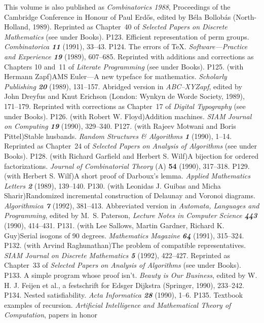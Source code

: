  This volume is also published as {\sl Combinatorics 1988}, Proceedings
 of the Cambridge Conference in Honour of Paul Erd\H os, edited
 by B\'ela Bollob\'as (North-Holland, 1989).
 Reprinted as Chapter~40 of {\sl Selected Papers on
 Discrete Mathematics\/} (see under Books).
\p P123. Efficient representation of perm groups. {\sl Combinatorica \bf11}
 (1991), 33--43.
\p P124. The errors of \TeX. {\sl Software---Practice
 and Experience\/ \bf19} (1989), 607--685. Reprinted with additions
 and corrections as Chapters 10 and~11 of {\sl Literate Programming\/}
 (see under Books).
\p P125. (with Hermann Zapf)\xskip AMS Euler---A new typeface for mathematics.
 {\sl Scholarly Publishing\/ \bf20} (1989), 131--157. Abridged version
 in {\sl ABC--XYZapf}, edited by John Dreyfus and Knut Erichson
 (London: Wynkyn de Worde Society, 1989), 171--179.
 Reprinted with corrections as Chapter~17 of {\sl Digital Typography\/}
 (see under Books).
\p P126. (with Robert W. Floyd)\xskip Addition machines. {\sl SIAM Journal on
 Computing\/ \bf19} (1990), 329--340.
\p P127. (with Rajeev Motwani and Boris Pittel)\xskip Stable husbands. {\sl
 Random Structures \& Algorithms\/ \bf1} (1990), 1--14.
 Reprinted as Chapter~24 of {\sl Selected Papers on Analysis of Algorithms\/}
 (see under Books).
\p *P128. (with Richard Garfield and Herbert S. Wilf)\xskip A bijection for
 ordered factorizations. {\sl Journal of Combinatorial Theory\/} (A)
 {\bf 54} (1990), 317--318.
\p *P129. (with Herbert S. Wilf)\xskip A short proof of Darboux's lemma.
 {\sl Applied Mathematics Letters\/ \bf2} (1989), 139--140.
\p *P130. (with Leonidas J. Guibas and Micha Sharir)\xskip Randomized
 incremental construction of Delaunay and Voronoi diagrams.
 {\sl Algorithmica\/ \bf7} (1992), 381--413.
 Abbreviated version in {\sl Automata, Languages and Programming},
 edited by M.~S. Paterson, {\sl Lecture Notes in Computer Science\/ \bf443}
 (1990), 414--431.
\p *P131. (with Lee Sallows, Martin Gardner, Richard K. Guy)\xskip Serial
 isogons of 90 degrees. {\sl Mathematics Magazine\/ \bf64} (1991), 315--324.
\p P132. (with Arvind Raghunathan)\xskip The problem of compatible
 representatives.
 {\sl SIAM Journal on Discrete Mathematics\/ \bf5} (1992), 422--427.
 Reprinted as Chapter~33 of {\sl Selected Papers on Analysis of Algorithms\/}
 (see under Books).
\p P133. A simple program whose proof isn't. {\sl Beauty is Our Business},
 edited by W. H. J. Feijen et al., a festschrift for Edsger Dijkstra
 (Springer, 1990), 233--242.
\p P134. Nested satisfiability. {\sl Acta Informatica \bf28} (1990), 1--6.
\p P135. Textbook examples of recursion. {\sl Artificial
 Intelligence and Mathematical Theory of Computation}, papers in honor
